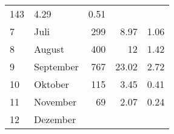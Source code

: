 \begin{longtable}{lXrrr}
       \num{143} &
       \num[round-mode=places,round-precision=2]{4,29} &
         \num[round-mode=places,round-precision=2]{0,51} \\

     7 &
     \multicolumn{1}{X}{ Juli   } &


       \num{299} &
       \num[round-mode=places,round-precision=2]{8,97} &
         \num[round-mode=places,round-precision=2]{1,06} \\

     8 &
     \multicolumn{1}{X}{ August   } &


       \num{400} &
       \num[round-mode=places,round-precision=2]{12} &
         \num[round-mode=places,round-precision=2]{1,42} \\

     9 &
     \multicolumn{1}{X}{ September   } &


       \num{767} &
       \num[round-mode=places,round-precision=2]{23,02} &
         \num[round-mode=places,round-precision=2]{2,72} \\

     10 &
     \multicolumn{1}{X}{ Oktober   } &


       \num{115} &
       \num[round-mode=places,round-precision=2]{3,45} &
         \num[round-mode=places,round-precision=2]{0,41} \\

     11 &
     \multicolumn{1}{X}{ November   } &


       \num{69} &
       \num[round-mode=places,round-precision=2]{2,07} &
         \num[round-mode=places,round-precision=2]{0,24} \\

     12 &
     \multicolumn{1}{X}{ Dezember   } &



\end{longtable}
